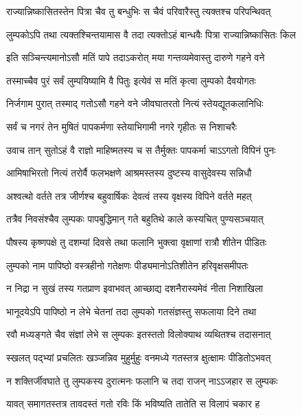 \twolineshloka
{राज्यान्निष्कासितस्तेन पित्रा चैव तु बन्धुभिः}%
{स चैवं परिवारैस्तु त्यक्तश्च परिपन्थिवत्}

\twolineshloka
{लुम्पकोऽपि तथा त्यक्तश्चिन्तयामास वै तदा}%
{त्यक्तोऽहं बान्धवैः पित्रा राज्यान्निष्कासितः किल}

\twolineshloka
{इति सञ्चिन्त्यमानोऽसौ मतिं पापे तदाऽकरोत्}%
{मया गन्तव्यमेवास्तु दारुणे गहने वने}

\twolineshloka
{तस्माच्चैव पुरं सर्वं लुम्पयिष्यामि वै पितुः}%
{इत्येवं स मतिं कृत्वा लुम्पको दैवयोगतः}

\twolineshloka
{निर्जगाम पुरात् तस्माद् गतोऽसौ गहने वने}%
{जीवघातरतो नित्यं स्तेयद्यूतकलानिधिः}

\twolineshloka
{सर्वं च नगरं तेन मुषितं पापकर्मणा}%
{स्तेयाभिगामी नगरे गृहीतः स निशाचरैः}

\twolineshloka
{उवाच तान् सुतोऽहं वै राज्ञो माहिष्मतस्य च}%
{स तैर्मुक्तः पापकर्मा चाऽऽगतो विपिनं पुनः}

\twolineshloka
{आमिषाभिरतो नित्यं तरोर्वै फलभक्षणे}%
{आश्रमस्तस्य दुष्टस्य वासुदेवस्य सन्निधौ}

\twolineshloka
{अश्वत्थो वर्तते तत्र जीर्णश्च बहुवार्षिकः}%
{देवत्वं तस्य वृक्षस्य विपिने वर्तते महत्}

\twolineshloka
{तत्रैव निवसंश्चैव लुम्पकः पापबुद्धिमान्}%
{गते बहुतिथे काले कस्यचित् पुण्यसञ्चयात्}

\twolineshloka
{पौषस्य कृष्णपक्षे तु दशम्यां दिवसे तथा}%
{फलानि भुक्त्वा वृक्षाणां रात्रौ शीतेन पीडितः}

\twolineshloka
{लुम्पको नाम पापिष्ठो वस्त्रहीनो गतेक्षणः}%
{पीड्यमानोऽतिशीतेन हरिवृक्षसमीपतः}

\twolineshloka
{न निद्रा न सुखं तस्य गतप्राण इवाभवत्}%
{आच्छाद्य दशनैरास्यमेवं नीता निशाखिला}

\twolineshloka
{भानूदयेऽपि पापिष्ठो न लेभे चेतनां तदा}%
{लुम्पको गतसंज्ञस्तु सफलाया दिने तथा}

\twolineshloka
{रवौ मध्यङ्गते चैव संज्ञां लेभे स लुम्पकः}%
{इतस्ततो विलोक्याथ व्यथितश्च तदासनात्}

\twolineshloka
{स्खलत् पद्भ्यां प्रचलितः खञ्जन्निव मुहुर्मुहुः}%
{वनमध्ये गतस्तत्र क्षुत्क्षामः पीडितोऽभवत्}

\twolineshloka
{न शक्तिर्जीवघाते तु लुम्पकस्य दुरात्मनः}%
{फलानि च तदा राजन् नाऽऽजहार स लुम्पकः}

\twolineshloka
{यावत् समागतस्तत्र तावदस्तं गतो रविः}%
{किं भविष्यति तातेति स विलापं चकार ह}

